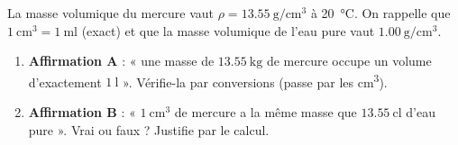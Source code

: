 \documentclass[11pt,a4paper]{article}
\begin{document}
\begin{exo}
La masse volumique du mercure vaut $\rho = \qty{13,55}{\gram\per\centi\metre\cubed}$ à \qty{20}{\celsius}.
On rappelle que $\qty{1}{\centi\metre\cubed}=\qty{1}{\milli\litre}$ (exact) et que la masse volumique
de l'eau pure vaut $\qty{1,00}{\gram\per\centi\metre\cubed}$.
\begin{enumerate}[label=\alph*),leftmargin=1.6em,itemsep=1pt]
  \item \textbf{Affirmation A} : « une masse de $\qty{13,55}{\kilo\gram}$ de mercure occupe un volume
        d'exactement $\qty{1}{\litre}$ ». Vérifie-la par conversions (passe par les \si{\centi\metre\cubed}).
  \item \textbf{Affirmation B} : « $\qty{1}{\centi\metre\cubed}$ de mercure a la même masse que
        $\qty{13,55}{\centi\litre}$ d'eau pure ». Vrai ou faux ? Justifie par le calcul.
\end{enumerate}
\end{exo}
\end{document}
